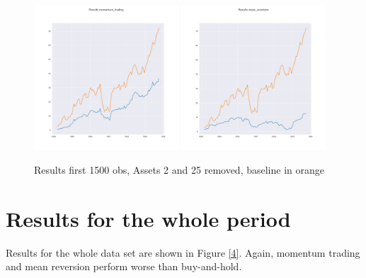 \begin{figure}[h!]
    \centering
    \includegraphics[width=0.48\textwidth]{../results/train_outliers_removed_momentum_trading_results.jpg}
    \includegraphics[width=0.48\textwidth]{../results/train_outliers_removed_mean_reversion_results.jpg}

    \caption{Results first 1500 obs, Assets 2 and 25 removed, baseline in orange}
    \label{3}
  
\end{figure}{}


\section{Results for the whole period}
Results for the whole data set are shown in Figure \ref{4}. Again, momentum trading and mean reversion perform worse than buy-and-hold. 

